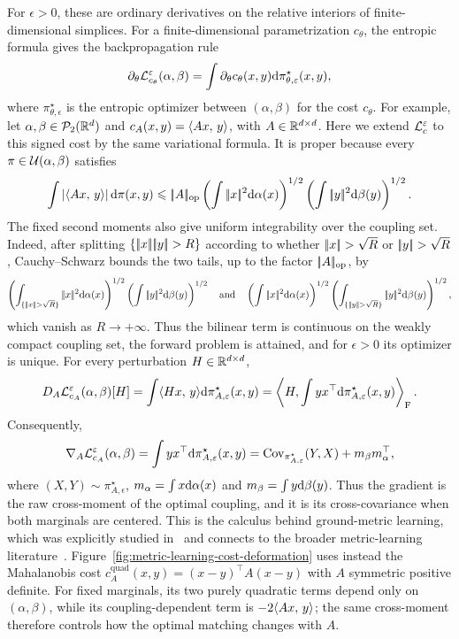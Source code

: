For $\epsilon>0$, these are ordinary derivatives on the relative interiors of finite-dimensional simplices. For a finite-dimensional parametrization $c_\theta$, the entropic formula gives the backpropagation rule
\[
	\partial_{\theta}\mathcal{L}_{c_\theta}^\varepsilon(\alpha,\beta)
	=
	\int \partial_\theta c_\theta(x,y)\mathrm{d}\pi_{\theta,\varepsilon}^\star(x,y),
\]
where $\pi_{\theta,\epsilon}^\star$ is the entropic optimizer between $(\alpha,\beta)$ for the cost $c_\theta$. For example, let $\alpha,\beta\in\mathcal{P}_2(\mathbb{R}^d)$ and $c_A(x,y)=\langle Ax,\,y\rangle$, with $A\in\mathbb{R}^{d\times d}$. Here we extend $\mathcal{L}_c^\varepsilon$ to this signed cost by the same variational formula. It is proper because every $\pi\in\mathcal{U}(\alpha,\beta)$ satisfies
\[
	\int\left\lvert\langle Ax,\,y\rangle\right\rvert\mathrm{d}\pi(x,y)
	\leqslant
	|\!| A |\!|_{\mathrm{op}}
	\left(\int|\!| x |\!|^2\mathrm{d}\alpha(x)\right)^{1/2}
	\left(\int|\!| y |\!|^2\mathrm{d}\beta(y)\right)^{1/2}.
\]
The fixed second moments also give uniform integrability over the coupling set. Indeed, after splitting $\{\norm{x}\norm{y}>R\}$ according to whether $\norm{x}>\sqrt R$ or $\norm{y}>\sqrt R$, Cauchy--Schwarz bounds the two tails, up to the factor $|\!| A |\!|_{\mathrm{op}}$, by
\[
	\left(\int_{\{\norm{x}>\sqrt R\}}\norm{x}^2\d\alpha(x)\right)^{1/2}
	\left(\int\norm{y}^2\d\beta(y)\right)^{1/2}
	\qandq
	\left(\int\norm{x}^2\d\alpha(x)\right)^{1/2}
	\left(\int_{\{\norm{y}>\sqrt R\}}\norm{y}^2\d\beta(y)\right)^{1/2},
\]
which vanish as $R\to+\infty$. Thus the bilinear term is continuous on the weakly compact coupling set, the forward problem is attained, and for $\epsilon>0$ its optimizer is unique. For every perturbation $H\in\mathbb{R}^{d\times d}$,
\[
	D_A\mathcal{L}_{c_A}^\varepsilon(\alpha,\beta)[H]
	=
	\int \langle Hx,\,y\rangle\mathrm{d}\pi_{A,\varepsilon}^\star(x,y)
	=
	\left\langle H,\int yx^\top\mathrm{d}\pi_{A,\varepsilon}^\star(x,y)\right\rangle_{\mathrm F}.
\]
Consequently,
\[
	\nabla_A\mathcal{L}_{c_A}^\varepsilon(\alpha,\beta)
	=
	\int yx^\top\mathrm{d}\pi_{A,\varepsilon}^\star(x,y)
	=
	\operatorname{Cov}_{\pi_{A,\varepsilon}^\star}(Y,X)+m_\beta m_\alpha^\top,
\]
where $(X,Y)\sim\pi_{A,\epsilon}^\star$, $m_\alpha=\int x\mathrm{d}\alpha(x)$ and $m_\beta=\int y\mathrm{d}\beta(y)$. Thus the gradient is the raw cross-moment of the optimal coupling, and it is its cross-covariance when both marginals are centered. This is the calculus behind ground-metric learning, which was explicitly studied in~\cite{CuturiGroundMetric2014} and connects to the broader metric-learning literature~\cite{MAL-019,bellet2015metric}. Figure~\ref{fig:metric-learning-cost-deformation} uses instead the Mahalanobis cost $c_A^{\mathrm{quad}}(x,y)=(x-y)^\top A(x-y)$ with $A$ symmetric positive definite. For fixed marginals, its two purely quadratic terms depend only on $(\alpha,\beta)$, while its coupling-dependent term is $-2\langle Ax,\,y\rangle$; the same cross-moment therefore controls how the optimal matching changes with $A$.

